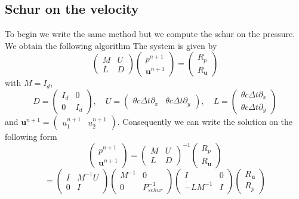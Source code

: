 \documentclass[a4paper,twoside,french,english,11pt]{article}
\newcommand{\dy}{\partial_y}
\newcommand{\dx}{\partial_x}
\newcommand{\ds}{\displaystyle}
\begin{document}
\subsection{Schur on the velocity}
To begin we write the same method but we compute the schur on the pressure. We obtain the following algorithm
The system is given by 
$$
\left(\begin{array}{ll} 
M  & U \\
 L & D\end{array}\right)\left(\begin{array}{l} 
  p^{n+1} \\
 \mathbf{u}^{n+1}
\end{array}\right)=\left(\begin{array}{l} 
 R_p\\
 R_{\mathbf{u}} \end{array}\right)
 $$
with $M=I_d$,
 $$
 D=\left(\begin{array}{ll} 
I_d  & 0 \\
 0 & I_d\end{array}\right),\quad
  U=\left(\begin{array}{ll} 
\ds\theta c\Delta t  \dx  & \ds\theta c\Delta t  \dy \end{array}\right),\quad
  L=\left(\begin{array}{l} 
\ds  \theta c \Delta t  \dx  \\
\ds \theta c \Delta t\dy \end{array}\right)
 $$
 and $\ds \mathbf{u}^{n+1}=\left(\begin{array}{ll} 
u_1^{n+1}  & u_2^{n+1} \end{array}\right)$. 
Consequently we can write the solution on the following form
$$
\left(\begin{array}{l} 
 p^{n+1} \\
  \mathbf{u}^{n+1}\end{array}\right) =\left(\begin{array}{ll}
M & U  \\
L & D\end{array}\right)^{-1}\left(\begin{array}{l} 
 R_p\\
 R_\mathbf{u} \end{array}\right)
$$
$$
=\left(\begin{array}{ll}
I & M^{-1} U  \\
0 & I\end{array}\right)\left(\begin{array}{ll}
M^{-1} & 0  \\
0 & P_{schur}^{-1}\end{array}\right)\left(\begin{array}{ll}
I & 0  \\
-LM^{-1} & I\end{array}\right)\left(\begin{array}{l} 
 R_\mathbf{u}\\
 R_p\end{array}\right)
 $$
\end{document}
